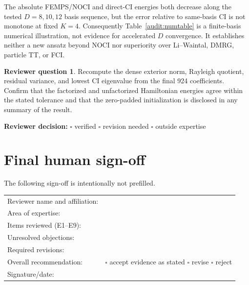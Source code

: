 \documentclass[11pt]{article}
\theoremstyle{definition}
\newtheorem*{reviewquestion}{Reviewer question}
\newcommand{\reviewline}{\par\smallskip\noindent
  \textbf{Reviewer decision:} $\square$ verified \quad $\square$ revision
  needed \quad $\square$ outside expertise\par\medskip}
\begin{document}
The absolute FEMPS/NOCI and direct-CI energies both decrease along the tested
$D=8,10,12$ basis sequence, but the error relative to same-basis CI is not
monotone at fixed $K=4$.  Consequently Table~\ref{audit:numtable} is a
finite-basis numerical illustration, not evidence for accelerated $D$
convergence.  It establishes neither a new ansatz beyond NOCI nor superiority
over Li--Waintal, DMRG, particle TT, or FCI.

\begin{reviewquestion}
Recompute the dense exterior norm, Rayleigh quotient, residual variance, and
lowest CI eigenvalue from the final 924 coefficients.  Confirm that the
factorized and unfactorized Hamiltonian energies agree within the stated
tolerance and that the zero-padded initialization is disclosed in any summary
of the result.
\end{reviewquestion}
\reviewline

\section{Final human sign-off}

The following sign-off is intentionally not prefilled.

\begin{tabular}{@{}P{45mm}P{95mm}@{}}
Reviewer name and affiliation: & \\[8mm]
Area of expertise: & \\[8mm]
Items reviewed (E1--E9): & \\[8mm]
Unresolved objections: & \\[16mm]
Required revisions: & \\[16mm]
Overall recommendation: & $\square$ accept evidence as stated \quad
$\square$ revise \quad $\square$ reject \\[8mm]
Signature/date: & \\
\end{tabular}



\end{document}
